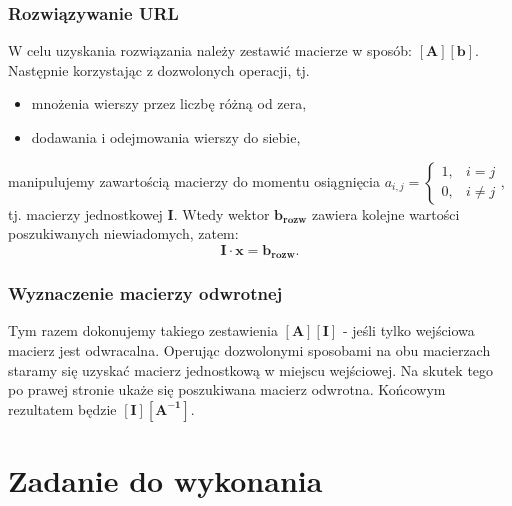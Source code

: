 \subsubsection{Rozwiązywanie URL}
W celu uzyskania rozwiązania należy zestawić macierze w sposób: $ \left[ \boldsymbol{A}\right]\left[\boldsymbol{b}\right] $. Następnie korzystając z dozwolonych operacji, tj.
\begin{itemize}
	\item mnożenia wierszy przez liczbę różną od zera,
	\item dodawania i odejmowania wierszy do siebie,
\end{itemize}
manipulujemy zawartością macierzy do momentu osiągnięcia $a_{i,j} = 
 \begin{cases}
	1,& i = j \\
	0,& i \neq j 
\end{cases} $, tj. macierzy jednostkowej $ \boldsymbol{I}. $ Wtedy wektor $ \boldsymbol{b_{rozw}} $ zawiera kolejne wartości poszukiwanych niewiadomych, zatem:
\begin{equation}
\boldsymbol{I} \cdot \boldsymbol{x} =  \boldsymbol{b_{rozw}}.
\end{equation}

\subsubsection{Wyznaczenie macierzy odwrotnej}
Tym razem dokonujemy takiego zestawienia $ \left[\boldsymbol{A}\right]\left[\boldsymbol{I}\right] $ - jeśli tylko wejściowa macierz jest odwracalna. Operując dozwolonymi sposobami na obu macierzach staramy się uzyskać macierz jednostkową w miejscu wejściowej. Na skutek tego po prawej stronie ukaże się poszukiwana macierz odwrotna. Końcowym rezultatem będzie $ \left[\boldsymbol{I}\right]\left[\boldsymbol{A^{-1}}\right]. $

\section{Zadanie do wykonania}

